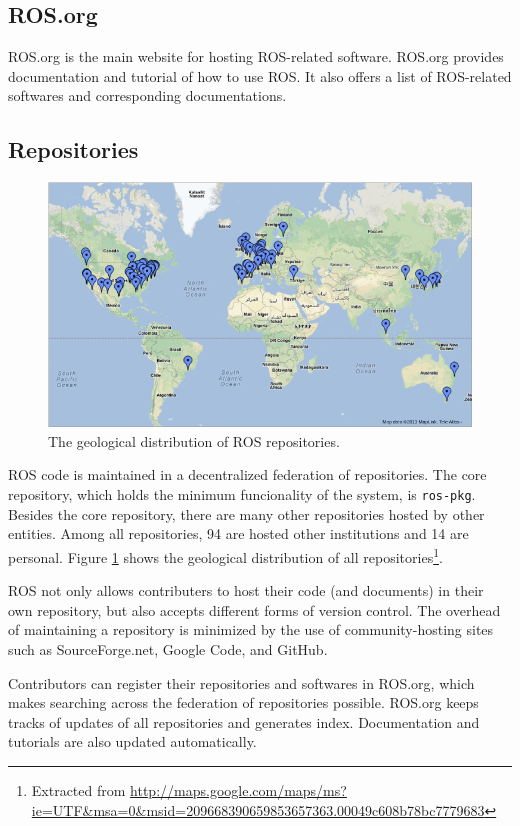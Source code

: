 \documentclass[a4paper, 10pt, conference]{ieeeconf}       %
\begin{document}
\subsection{ROS.org}
ROS.org is the main website for hosting ROS-related software. ROS.org provides documentation and tutorial of how to use ROS. It also offers a list of ROS-related softwares and corresponding documentations. 

\subsection{Repositories}

\begin{figure}[tbhp]
  \centering
  \includegraphics[width=.9\textwidth]{repos}
  \caption{The geological distribution of ROS repositories.}
  \label{fig:repos}
\end{figure}

ROS code is maintained in a decentralized federation of repositories. The core repository, which holds the minimum funcionality of the system, is \texttt{ros-pkg}. Besides the core repository, there are many other repositories hosted by other entities. Among all repositories, 94 are hosted other institutions and 14 are personal. Figure \ref{fig:repos} shows the geological distribution of all repositories\footnote{Extracted from \url{http://maps.google.com/maps/ms?ie=UTF\&msa=0\&msid=209668390659853657363.00049c608b78bc7779683}}.

ROS not only allows contributers to host their code (and documents) in their own repository, but also accepts different forms of version control. The overhead of maintaining a repository is minimized by the use of community-hosting sites such as SourceForge.net, Google
Code, and GitHub.

Contributors can register their repositories and softwares in ROS.org, which makes searching across the federation of repositories possible. ROS.org keeps tracks of updates of all repositories and generates index. Documentation and tutorials are also updated automatically.
\end{document}
